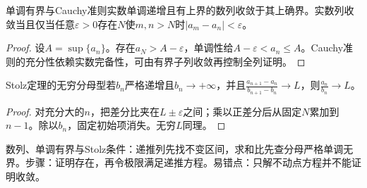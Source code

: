 \begin{theorem}{单调有界与Cauchy准则}实数单调递增且有上界的数列收敛于其上确界。实数列收敛当且仅当任意$\varepsilon>0$存在$N$使$m,n>N$时$|a_m-a_n|<\varepsilon$。\end{theorem}
\begin{proof}设$A=\sup\{a_n\}$。存在$a_N>A-\varepsilon$，单调性给$A-\varepsilon<a_n\le A$。Cauchy准则的充分性依赖实数完备性，可由有界子列收敛再控制全列证明。\end{proof}
\begin{theorem}{Stolz定理的无穷分母型}若$b_n$严格递增且$b_n\to+\infty$，并且$\frac{a_{n+1}-a_n}{b_{n+1}-b_n}\to L$，则$\frac{a_n}{b_n}\to L$。\end{theorem}
\begin{proof}对充分大的$n$，把差分比夹在$L\pm\varepsilon$之间；乘以正差分后从固定$N$累加到$n-1$。除以$b_n$，固定初始项消失。无穷$L$同理。\end{proof}

\begin{method}{数列、单调有界与Stolz}条件：递推列先找不变区间，求和比先查分母严格单调无界。步骤：证明存在，再令极限满足递推方程。易错点：只解不动点方程并不能证明收敛。\end{method}

